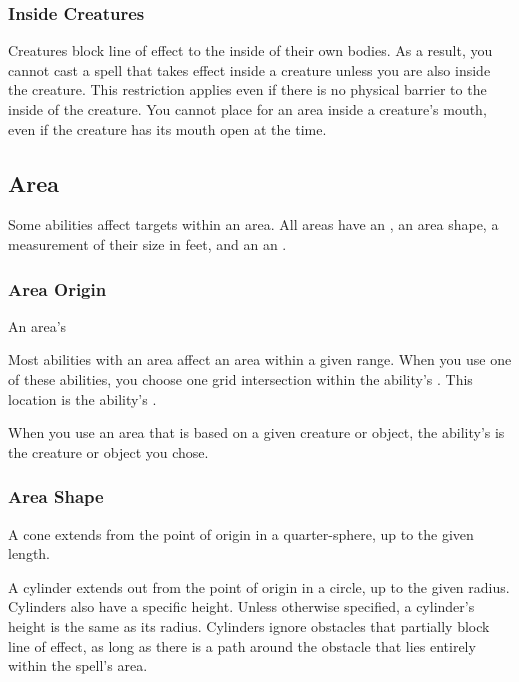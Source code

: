         \subsubsection{Inside Creatures}
            Creatures block line of effect to the inside of their own bodies.
            As a result, you cannot cast a spell that takes effect inside a creature unless you are also inside the creature.
            This restriction applies even if there is no physical barrier to the inside of the creature.
            You cannot place  for an area inside a creature's mouth, even if the creature has its mouth open at the time.

    \subsection{Area}\label{Area}

        Some abilities affect targets within an area.
        All areas have an , an area shape, a measurement of their size in feet, and an an .

    \subsubsection{Area Origin}

        An area's  

        Most abilities with an area affect an area within a given range.
        When you use one of these abilities, you choose one grid intersection within the ability's .
        This location is the ability's .

        When you use an area that is based on a given creature or object, the ability's  is the creature or object you chose.

        \subsubsection{Area Shape}

             A cone extends from the point of origin in a quarter-sphere, up to the given length.

             A cylinder extends out from the point of origin in a circle, up to the given radius.
            Cylinders also have a specific height.
            Unless otherwise specified, a cylinder's height is the same as its radius.
            Cylinders ignore obstacles that partially block line of effect, as long as there is a path around the obstacle that lies entirely within the spell's area.

